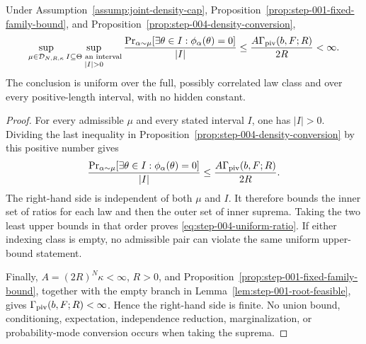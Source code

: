 \begin{proposition}
\label{prop:step-004-uniform-ratio}
Under Assumption~\ref{assump:joint-density-cap},
Proposition~\ref{prop:step-001-fixed-family-bound}, and
Proposition~\ref{prop:step-004-density-conversion},
\begin{equation}
\sup_{\mu\in\mathcal D_{N,R,\kappa}}
\sup_{\substack{I\subseteq\Theta\text{ an interval}\\|I|>0}}
\frac{\Pr_{\alpha\sim\mu}[
  \exists\theta\in I:\phi_\alpha(\theta)=0]}{|I|}
\leq
\frac{A\Gamma_{\rm piv}(b,F;R)}{2R}
<\infty.
\label{eq:step-004-uniform-ratio}
\end{equation}
The conclusion is uniform over the full, possibly correlated law class and
over every positive-length interval, with no hidden constant.
\end{proposition}

\begin{proof}
For every admissible $\mu$ and every stated interval $I$, one has $|I|>0$.
Dividing the last inequality in
Proposition~\ref{prop:step-004-density-conversion} by this positive number
gives
\begin{equation}
\frac{\Pr_{\alpha\sim\mu}[
  \exists\theta\in I:\phi_\alpha(\theta)=0]}{|I|}
\leq
\frac{A\Gamma_{\rm piv}(b,F;R)}{2R}.
\label{eq:step-004-pairwise-ratio}
\end{equation}
The right-hand side is independent of both $\mu$ and $I$.  It therefore
bounds the inner set of ratios for each law and then the outer set of inner
suprema.  Taking the two least upper bounds in that order proves
\eqref{eq:step-004-uniform-ratio}.  If either indexing class is empty, no
admissible pair can violate the same uniform upper-bound statement.

Finally, $A=(2R)^N\kappa<\infty$, $R>0$, and
Proposition~\ref{prop:step-001-fixed-family-bound}, together with the empty
branch in Lemma~\ref{lem:step-001-root-feasible}, gives
$\Gamma_{\rm piv}(b,F;R)<\infty$.  Hence the right-hand side is finite.  No
union bound, conditioning, expectation, independence reduction,
marginalization, or probability-mode conversion occurs when taking the
suprema.
\end{proof}

